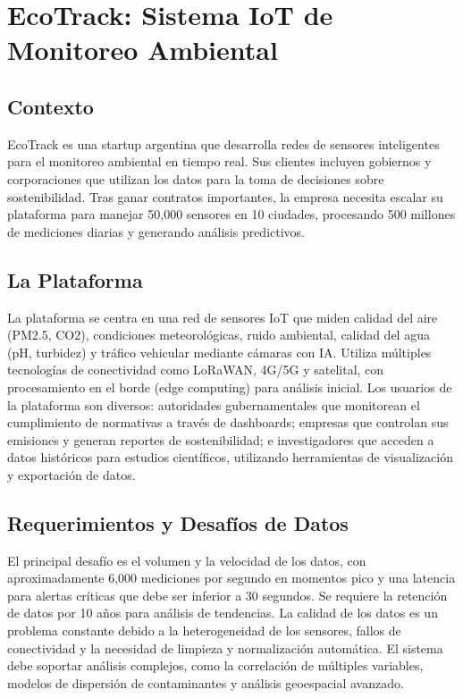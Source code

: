 \documentclass[12pt]{article}
\begin{document}
\newpage

\section{EcoTrack: Sistema IoT de Monitoreo Ambiental}

\subsection{Contexto}
EcoTrack es una startup argentina que desarrolla redes de sensores inteligentes para el monitoreo ambiental en tiempo real. Sus clientes incluyen gobiernos y corporaciones que utilizan los datos para la toma de decisiones sobre sostenibilidad. Tras ganar contratos importantes, la empresa necesita escalar su plataforma para manejar 50,000 sensores en 10 ciudades, procesando 500 millones de mediciones diarias y generando análisis predictivos.

\subsection{La Plataforma}
La plataforma se centra en una red de sensores IoT que miden calidad del aire (PM2.5, CO2), condiciones meteorológicas, ruido ambiental, calidad del agua (pH, turbidez) y tráfico vehicular mediante cámaras con IA. Utiliza múltiples tecnologías de conectividad como LoRaWAN, 4G/5G y satelital, con procesamiento en el borde (edge computing) para análisis inicial. Los usuarios de la plataforma son diversos: autoridades gubernamentales que monitorean el cumplimiento de normativas a través de dashboards; empresas que controlan sus emisiones y generan reportes de sostenibilidad; e investigadores que acceden a datos históricos para estudios científicos, utilizando herramientas de visualización y exportación de datos.

\subsection{Requerimientos y Desafíos de Datos}
El principal desafío es el volumen y la velocidad de los datos, con aproximadamente 6,000 mediciones por segundo en momentos pico y una latencia para alertas críticas que debe ser inferior a 30 segundos. Se requiere la retención de datos por 10 años para análisis de tendencias. La calidad de los datos es un problema constante debido a la heterogeneidad de los sensores, fallos de conectividad y la necesidad de limpieza y normalización automática. El sistema debe soportar análisis complejos, como la correlación de múltiples variables, modelos de dispersión de contaminantes y análisis geoespacial avanzado.
\end{document}
